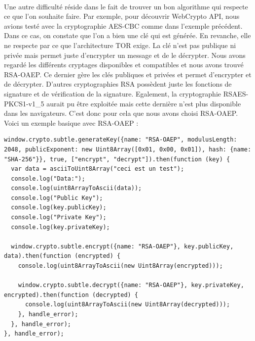 \documentclass[a4paper,12pt]{report}
\begin{document}
	\paragraph*{}
	Une autre difficulté réside dans le fait de trouver un bon algorithme qui respecte ce que l'on souhaite faire. Par exemple, pour découvrir WebCrypto API, nous avions testé avec la cryptographie AES-CBC comme dans l'exemple précédent.
	Dans ce cas, on constate que l'on a bien une clé qui est générée. En revanche, elle ne respecte par ce que l'architecture TOR exige. La clé n'est pas publique ni privée mais permet juste d'encrypter un message et de le décrypter. Nous avons regardé les différents cryptages disponibles et compatibles et nous avons trouvé RSA-OAEP. Ce dernier gère les clés publiques et privées et permet d'encrypter et de décrypter. D'autres cryptographies RSA possèdent juste les fonctions de signature et de vérification de la signature. Egalement, la cryptographie RSAES-PKCS1-v1\_5	 aurait pu être exploitée mais cette dernière n'est plus disponible dans les navigateurs. C'est donc pour cela que nous avons choisi RSA-OAEP.\\
	Voici un exemple basique avec RSA-OAEP :
	\begin{lstlisting}
window.crypto.subtle.generateKey({name: "RSA-OAEP", modulusLength: 2048, publicExponent: new Uint8Array([0x01, 0x00, 0x01]), hash: {name: "SHA-256"}}, true, ["encrypt", "decrypt"]).then(function (key) {
  var data = asciiToUint8Array("ceci est un test");
  console.log("Data:");
  console.log(uint8ArrayToAscii(data));
  console.log("Public Key");
  console.log(key.publicKey);
  console.log("Private Key");
  console.log(key.privateKey);

  window.crypto.subtle.encrypt({name: "RSA-OAEP"}, key.publicKey, data).then(function (encrypted) {
    console.log(uint8ArrayToAscii(new Uint8Array(encrypted)));

    window.crypto.subtle.decrypt({name: "RSA-OAEP"}, key.privateKey, encrypted).then(function (decrypted) {
      console.log(uint8ArrayToAscii(new Uint8Array(decrypted)));
    }, handle_error);
  }, handle_error);
}, handle_error);
	\end{lstlisting}
\end{document}

